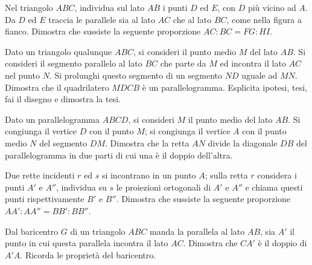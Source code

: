 \noindent\begin{minipage}{0.6\textwidth}\parindent15pt
\begin{esercizio}
\label{ese:6.35}
Nel triangolo $ABC$, individua sul lato $AB$ i punti $D$ ed $E$, con $D$ più vicino ad $A$. Da $D$ ed $E$ traccia le parallele sia al lato $AC$ che al lato $BC$, come nella figura a fianco. Dimostra che sussiste la seguente proporzione $AC:BC=FG:HI$.
\end{esercizio}
\end{minipage}\hfil
\begin{minipage}{0.4\textwidth}
	\centering
\end{minipage}

\begin{multicols}{2}

\begin{esercizio}
\label{ese:6.36}
Dato un triangolo qualunque $ABC$, si consideri il punto medio $M$ del lato $AB$. Si consideri il segmento parallelo al lato $BC$ che parte da $M$ ed incontra il lato $AC$ nel punto $N$. Si prolunghi questo segmento di un segmento $ND$ uguale ad $MN$. Dimostra che il quadrilatero $MDCB$ è un parallelogramma. Esplicita ipotesi, tesi, fai il disegno e dimostra la tesi.
\end{esercizio}

\begin{esercizio}
\label{ese:6.37}
Dato un parallelogramma $ABCD$, si consideri $M$ il punto medio del lato $AB$. Si congiunga il vertice $D$ con il punto $M$; si congiunga il vertice $A$ con il punto medio $N$ del segmento $DM$. Dimostra che la retta $AN$ divide la diagonale $DB$ del parallelogramma in due parti di cui una è il doppio dell'altra.
\end{esercizio}

\begin{esercizio}
\label{ese:6.38}
Due rette incidenti $r$ ed $s$ si incontrano in un punto $A$; sulla retta $r$ considera i punti $A'$ e $A''$, individua su $s$ le proiezioni ortogonali di $A'$ e $A''$ e chiama questi punti rispettivamente $B'$ e $B''$. Dimostra che sussiste la seguente proporzione $AA' : AA'' = BB' : BB''$.
\end{esercizio}

\begin{esercizio}
\label{ese:6.39}
Dal baricentro $G$ di un triangolo $ABC$ manda la parallela al lato $AB$, sia $A'$ il punto in cui questa parallela incontra il lato $AC$. Dimostra che $CA'$ è il doppio di $A'A$. Ricorda le proprietà del baricentro.
\end{esercizio}


\end{multicols}
